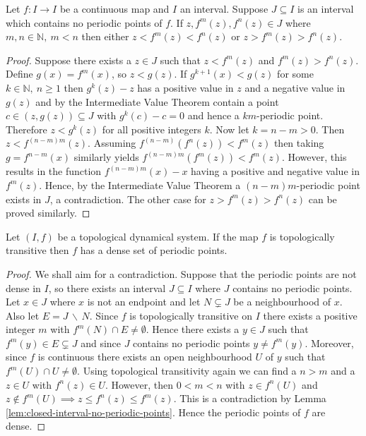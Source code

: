 \begin{lem} \label{lem:closed-interval-no-periodic-points}
    Let $f: I \to I$ be a continuous map and $I$ an interval. Suppose $J \subseteq I$ is an interval which contains no periodic points of $f$. If $z, f^m(z), f^n(z) \in J$ where $m, n \in \mathbb{N}, \ m < n$ then either $z < f^m(z) < f^n(z)$ or $z > f^m(z) > f^n(z)$.
    \begin{proof}
        Suppose there exists a $z \in J$ such that $z < f^m(z)$ and $f^m(z) > f^n(z)$. Define $g(x) = f^m(x)$, so $z < g(z)$. If $g^{k+1}(x) < g(z)$ for some $k \in \mathbb{N}, \ n \geq 1$ then $g^k(z) - z$ has a positive value in $z$ and a negative value in $g(z)$ and by the Intermediate Value Theorem contain a point $c \in (z, g(z)) \subseteq J$ with $g^k(c) - c = 0$ and hence a $km$-periodic point. Therefore $z < g^k(z)$ for all positive integers $k$. Now let $k = n - m > 0$. Then $z < f^{(n - m)m}(z)$. Assuming $f^{(n-m)}(f^n(z)) < f^m(z)$ then taking $g = f^{n-m}(x)$ similarly yields $f^{(n-m)m}(f^m(z)) < f^m(z)$. However, this results in the function $f^{(n-m)m}(x) - x$ having a positive and negative value in $f^m(z)$. Hence, by the Intermediate Value Theorem a $(n-m)m$-periodic point exists in $J$, a contradiction. The other case for $z > f^m(z) > f^n(z)$ can be proved similarly.
    \end{proof}
\end{lem}

\begin{prop} \label{prop:transitivity-interval-implies-dense-periodic}
    Let $(I, f)$ be a topological dynamical system. If the map $f$ is topologically transitive then $f$ has a dense set of periodic points.
    \begin{proof}
        We shall aim for a contradiction. Suppose that the periodic points are not dense in $I$, so there exists an interval $J \subseteq I$ where $J$ contains no periodic points. Let $x \in J$ where $x$ is not an endpoint and let $N \subsetneq J$ be a neighbourhood of $x$. Also let $E = J\, \backslash\, N$. Since $f$ is topologically transitive on $I$ there exists a positive integer $m$ with $f^m(N) \cap E \neq \emptyset$. Hence there exists a $y \in J$ such that $f^m(y) \in E \subsetneq J$ and since $J$ contains no periodic points $y \neq f^m(y)$. Moreover, since $f$ is continuous there exists an open neighbourhood $U$ of $y$ such that $f^m(U) \cap U \neq \emptyset$. Using topological transitivity again we can find a $n > m$ and a $z \in U$ with $f^n(z) \in U$. However, then $0 < m < n$ with $z \in f^n(U)$ and $z \notin f^m(U) \implies z \leq f^n(z) \leq f^m(z)$. This is a contradiction by Lemma \ref{lem:closed-interval-no-periodic-points}. Hence the periodic points of $f$ are dense.
    \end{proof}
\end{prop}

